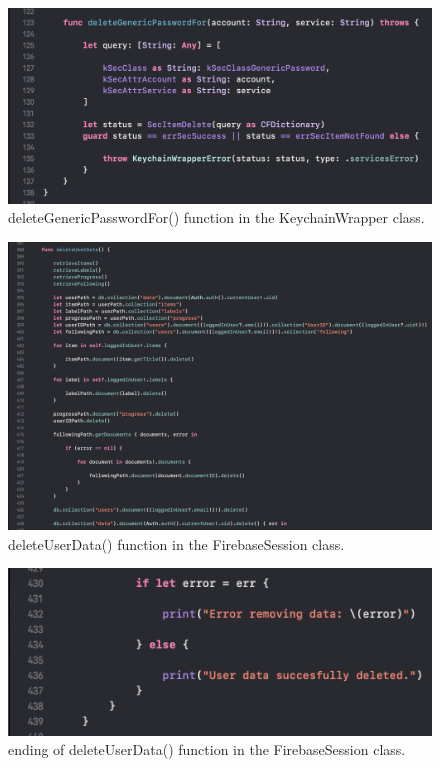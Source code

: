 \begin{figure}[H]
    \centering
    \includegraphics[width=\textwidth]{./graphics/Implementation/Settings/keychain4.png}
    \caption{deleteGenericPasswordFor() function in the KeychainWrapper class.}
    \label{fig:keychain4}
\end{figure}

\begin{figure}[H]
    \centering
    \includegraphics[width=\textwidth]{./graphics/Implementation/Settings/firebasesession1.png}
    \caption{deleteUserData() function in the FirebaseSession class.}
    \label{fig:firebasesession1_settings}
\end{figure}

\begin{figure}[H]
    \centering
    \includegraphics[width=\textwidth]{./graphics/Implementation/Settings/firebasesession2.png}
    \caption{ending of deleteUserData() function in the FirebaseSession class.}
    \label{fig:firebasesession2_settings}
\end{figure}

